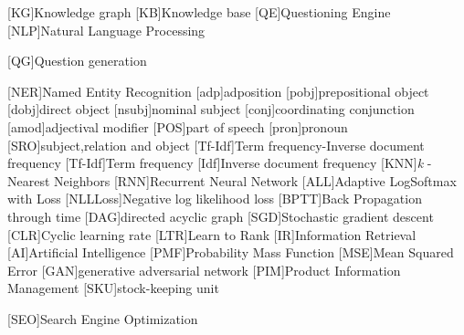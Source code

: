 

\begin{acronym}
[KG]{Knowledge graph}
[KB]{Knowledge base}
[QE]{Questioning Engine}
[NLP]{Natural Language Processing}

[QG]{Question generation}

[NER]{Named Entity Recognition}
[adp]{adposition}
[pobj]{prepositional object}
[dobj]{direct object}
[nsubj]{nominal subject}
[conj]{coordinating conjunction}
[amod]{adjectival modifier}
[POS]{part of speech}
[pron]{pronoun}
[SRO]{subject,relation and object}
[Tf-Idf]{Term frequency-Inverse document frequency}
[Tf-Idf]{Term frequency}
[Idf]{Inverse document frequency}
[KNN]{\textit{k} -Nearest Neighbors}
[RNN]{Recurrent Neural Network}
[ALL]{Adaptive LogSoftmax with Loss}
[NLLLoss]{Negative log likelihood loss}
[BPTT]{Back Propagation through time}
[DAG]{directed acyclic graph }
[SGD]{Stochastic gradient descent }
[CLR]{Cyclic learning rate }
[LTR]{Learn to Rank }
[IR]{Information Retrieval }
[AI]{Artificial Intelligence }
[PMF]{Probability Mass Function }
[MSE]{Mean Squared Error}
[GAN]{generative adversarial network}
[PIM]{Product Information Management}
[SKU]{stock-keeping unit}

[SEO]{Search Engine Optimization}

\end{acronym}

